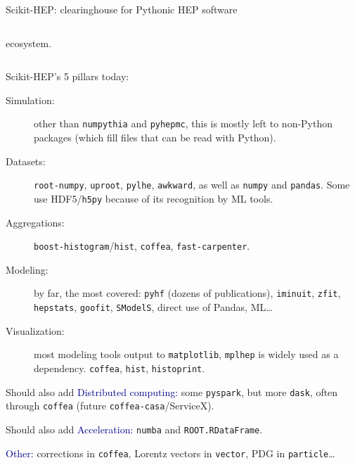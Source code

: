 \documentclass[aspectratio=169]{beamer}
\begin{document}
\begin{frame}{Scikit-HEP: clearinghouse for Pythonic HEP software}
\begin{columns}
ecosystem.
\end{columns}
\end{frame}

\begin{frame}{Scikit-HEP's 5 pillars today:}
\vspace{0.3 cm}

\begin{description}
\item[Simulation:] other than \texttt{numpythia} and \texttt{pyhepmc}, this is mostly left to non-Python packages (which fill files that can be read with Python).

\item[Datasets:] \texttt{root-numpy}, \texttt{uproot}, \texttt{pylhe}, \texttt{awkward}, as well as \texttt{numpy} and \texttt{pandas}. Some use HDF5/\texttt{h5py} because of its recognition by ML tools.

\item[Aggregations:] \texttt{boost-histogram}/\texttt{hist}, \texttt{coffea}, \texttt{fast-carpenter}.

\item[Modeling:] by far, the most covered: \texttt{pyhf} (dozens of publications), \texttt{iminuit}, \texttt{zfit}, \texttt{hepstats}, \texttt{goofit}, \texttt{SModelS}, direct use of Pandas, ML\ldots

\item[Visualization:] most modeling tools output to \texttt{matplotlib}, \texttt{mplhep} is widely used as a dependency. \texttt{coffea}, \texttt{hist}, \texttt{histoprint}.

\end{description}

\vspace{0.25 cm}
Should also add \textcolor{darkblue}{Distributed computing:} some \texttt{pyspark}, but more \texttt{dask}, often through \texttt{coffea} (future \texttt{coffea-casa}/ServiceX).

\vspace{0.25 cm}
Should also add \textcolor{darkblue}{Acceleration:} \texttt{numba} and \texttt{ROOT.RDataFrame}.

\vspace{0.25 cm}
\textcolor{darkblue}{Other:} corrections in \texttt{coffea}, Lorentz vectors in \texttt{vector}, PDG in \texttt{particle}\ldots
\end{frame}
\end{document}
